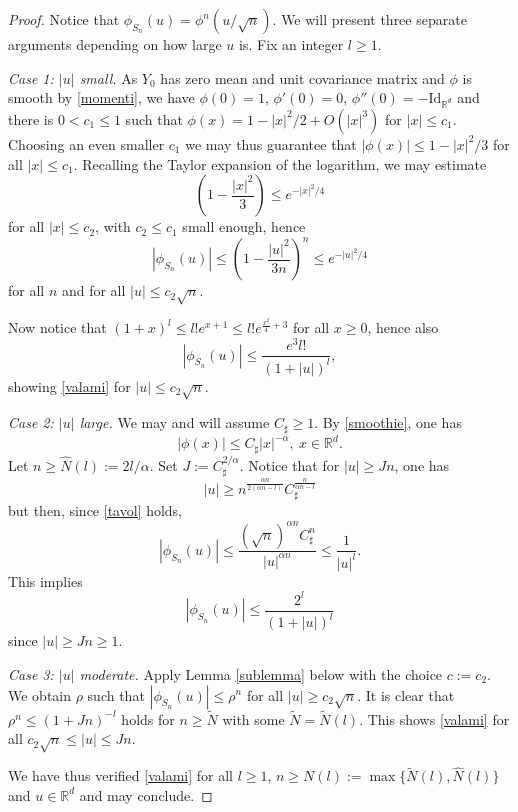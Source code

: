 \documentclass[10pt,a4paper]{amsart}
\begin{document}
\begin{proof}
Notice that $\phi_{S_{n}}(u)=\phi^{n}(u/\sqrt{n})$. We will present three separate arguments
depending on how large $u$ is. Fix an integer $l\geq 1$.

\smallskip

\noindent\textsl{Case 1: $|u|$ small.} As $Y_{0}$ has zero mean and unit covariance matrix and $\phi$ is smooth
by \eqref{momenti}, we have $\phi(0)=1$, $\phi'(0)=0$, $\phi''(0)=-\mathrm{Id}_{\mathbb{R}^{d}}$ 
and there is $0<c_{1}\leq 1$ such that 
$\phi(x)=1-|x|^{2}/2+O(|x|^{3})$ for $|x|\leq c_{1}$. Choosing an even smaller $c_{1}$ we may thus
guarantee that $|\phi(x)|\leq 1-|x|^{2}/3$ for all $|x|\leq c_{1}$. Recalling the Taylor expansion
of the logarithm, we may estimate 
$$
\left(1-\frac{|x|^{2}}{3}\right)\leq e^{-|x|^{2}/4}
$$
for all $|x|\leq c_{2}$, with $c_{2}\leq c_{1}$ small enough, hence
$$
|\phi_{S_{n}}(u)|\leq \left(1-\frac{|u|^{2}}{3n}\right)^{n}\leq e^{-|u|^{2}/4}
$$
for all $n$ and for all $|u|\leq c_{2}\sqrt{n}$.

Now notice that $(1+x)^{l}\leq l!e^{x+1}\leq l! e^{\frac{x^{2}}{4} +3}$ for all $x\geq 0$,
hence also 
$$
|\phi_{S_{n}}(u)|\leq \frac{e^{3}l!}{(1+|u|)^{l}},
$$
showing \eqref{valami} for $|u|\leq c_{2}\sqrt{n}$.

\smallskip{}

\noindent\textsl{Case 2: $|u|$ large.} We may and will assume $C_{\sharp}\geq 1$. By \eqref{smoothie}, one has 
\begin{equation}\label{tavol}
|\phi(x)|\leq C_{\sharp}|x|^{-\alpha},\ x\in\mathbb{R}^{d}.	
\end{equation} 
Let $n\geq \hat{N}(l):=2l/\alpha$. 
Set $J:=C_{\sharp}^{2/\alpha}$. Notice that for $|u|\geq Jn$, one has
$$
|u|\geq n^{\frac{\alpha n}{2(\alpha n -l)}}C_{\sharp}^{\frac{n}{\alpha n-l}}
$$
but then, since \eqref{tavol} holds,
$$
|\phi_{S_{n}}(u)|\leq \frac{(\sqrt{n})^{\alpha n}C_{\sharp}^{n}}{|u|^{\alpha n} }\leq \frac{1}{|u|^{l}}.
$$
This implies 
$$
|\phi_{S_{n}}(u)|\leq \frac{2^{l}}{(1+|u|)^{l}}
$$
since $|u|\geq Jn\geq 1$.

\smallskip{}


\noindent\textsl{Case 3: $|u|$ moderate.}
Apply Lemma \ref{sublemma} below
with the choice $c:=c_{2}$. We obtain $\rho$ such that $|\phi_{S_{n}}(u)|\leq \rho^{n}$
for all $|u|\geq c_{2}\sqrt{n}$. 
It is clear that $\rho^{n}\leq (1+Jn)^{-l}$ holds for $n\geq \tilde{N}$ with some 
$\tilde{N}=\tilde{N}(l)$.
This shows \eqref{valami} for all $c_{2}\sqrt{n}\leq |u|\leq Jn$.

\smallskip


We have thus verified \eqref{valami} for all $l\geq 1$, $n\geq N(l):=\max\{\tilde{N}(l),\hat{N}(l)\}$ 
and $u\in\mathbb{R}^{d}$ and may conclude. 
\end{proof} 
\end{document}
